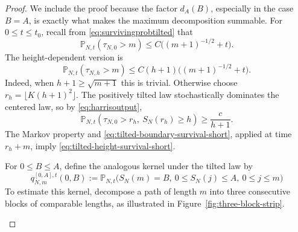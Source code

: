 \documentclass[11pt]{article}
\theoremstyle{plain}
\theoremstyle{definition}
\theoremstyle{remark}
\newcommand{\Pp}{\mathbb P}
\begin{document}
\begin{proof}
We include the proof because the factor \(d_A(B)\), especially in the case
\(B=A\), is exactly what makes the maximum decomposition summable.
For \(0\le t\le t_0\), recall from \eqref{eq:survivingprobtilted}
that
\begin{equation}
 \Pp_{N,t}(\tau_{N,0}>m)
 \le C\bigl((m+1)^{-1/2}+t\bigr).
 \label{eq:tilted-boundary-survival-short}
\end{equation}
The height-dependent version is
\begin{equation}
 \Pp_{N,t}(\tau_{N,h}>m)
 \le C(h+1)\bigl((m+1)^{-1/2}+t\bigr).
 \label{eq:tilted-height-survival-short}
\end{equation}
Indeed, when \(h+1\ge\sqrt{m+1}\) this is trivial.  Otherwise choose
\(r_h=\lfloor K(h+1)^2\rfloor\).  The positively tilted law stochastically
dominates the centered law, so by \eqref{eq:harrisoutput},
\[
 \Pp_{N,t}(\tau_{N,0}>r_h,\ S_N(r_h)\ge h)
 \ge \frac{c}{h+1}.
\]
The Markov property and \eqref{eq:tilted-boundary-survival-short}, applied
at time \(r_h+m\), imply
\eqref{eq:tilted-height-survival-short}.

For \(0\le B\le A\), define the analogous kernel under the
tilted law by
\[
 q_{N,m}^{[0,A],t}(0,B)
 :=
 \Pp_{N,t}\bigl(
   S_N(m)=B,\ 
   0\le S_N(j)\le A,\ 0\le j\le m
 \bigr)
\]
To estimate this kernel,
decompose a path of length \(m\) into three consecutive blocks of
comparable lengths, as illustrated in
Figure~\ref{fig:three-block-strip}. \begin{figure}[ht]
\centering
{}
\end{figure}
\end{proof}
\end{document}
